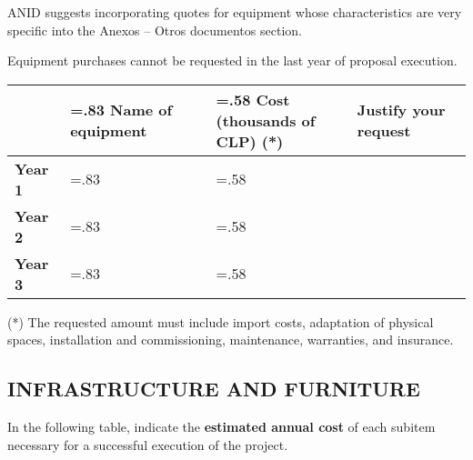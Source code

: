 \documentclass[MAIN.tex]{subfiles}
\begin{document}
\medskip

\noindent ANID suggests incorporating quotes for equipment whose characteristics are very specific into the Anexos – Otros documentos section.

\medskip

\noindent Equipment purchases cannot be requested in the last year of proposal execution.

\begin{center}
\begin{tabularx}{\linewidth}{l|>{\hsize=.83\hsize\linewidth\hsize}X|>{\hsize=.58\hsize\linewidth\hsize}X|>{\hsize=1.59\hsize\linewidth\hsize}X|}
\hhline{~---}
& \cellcolor{tcc}\centering\textbf{Name of equipment}
& \cellcolor{tcc}\centering\textbf{Cost\\\small{(thousands of CLP) (*)}}
& \cellcolor{tcc}\centering\textbf{Justify your request}
\tabularnewline\hline
\multicolumn{1}{|l|}{\cellcolor{tcc}\textbf{Year 1}}
& %
& %
& %
\tabularnewline\hline
\multicolumn{1}{|l|}{\cellcolor{tcc}\textbf{Year 2}}
& %
& %
& %
\tabularnewline\hline
\multicolumn{1}{|l|}{\cellcolor{tcc}\textbf{Year 3}}
& %
& %
& %
\tabularnewline\hline
\end{tabularx}
\end{center}

\noindent (*) The requested amount must include import costs, adaptation of physical spaces, installation and commissioning, maintenance, warranties, and insurance.

\subsection*{\uppercase{Infrastructure and furniture}}

In the following table, indicate the \textbf{estimated annual cost} of each subitem necessary for a successful execution of the project. 
\end{document}
